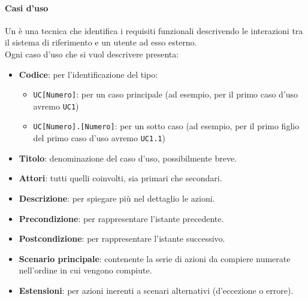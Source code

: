 		\paragraph{Casi d'uso}\label{PP:Sviluppo:AdR:CasiUso}
		Un  è una tecnica che identifica i requisiti funzionali descrivendo le interazioni tra il sistema di riferimento e un utente ad esso esterno. \\
		Ogni caso d'uso che si vuol descrivere presenta:
		\begin{itemize}
		 	\item \textbf{Codice}: per l'identificazione del tipo:
		 	\begin{itemize}
		 		\item \texttt{UC[Numero]}: per un caso principale (ad esempio, per il primo caso d'uso avremo \texttt{UC1})
		 		\item \texttt{UC[Numero].[Numero]}: per un sotto caso (ad esempio, per il primo figlio del primo caso d'uso avremo \texttt{UC1.1})
		 	\end{itemize}
		 	\item \textbf{Titolo}: denominazione del caso d'uso, possibilmente breve.
		 	\item \textbf{Attori}: tutti quelli coinvolti, sia primari che secondari.
		 	\item \textbf{Descrizione}: per spiegare più nel dettaglio le azioni.
		 	\item \textbf{Precondizione}: per rappresentare l'istante precedente.
		 	\item \textbf{Postcondizione}: per rappresentare l'istante successivo.
		 	\item \textbf{Scenario principale}: contenente la serie di azioni da compiere numerate nell'ordine in cui vengono compiute.
		 	\item \textbf{Estensioni}: per azioni inerenti a scenari alternativi (d'eccezione o errore).
		\end{itemize}







